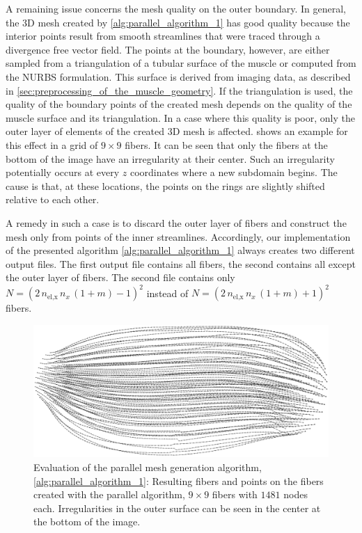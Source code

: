 A remaining issue concerns the mesh quality on the outer boundary. In general, the 3D mesh created by \cref{alg:parallel_algorithm_1} has good quality because the interior points result from smooth streamlines that were traced through a divergence free vector field. 
The points at the boundary, however, are either sampled from a triangulation of a tubular surface of the muscle or computed from the NURBS formulation. This surface is derived from imaging data, as described in \cref{sec:preprocessing_of_the_muscle_geometry}. If the triangulation is used, the quality of the boundary points of the created mesh depends on the quality of the muscle surface and its triangulation. In a case where this quality is poor, only the outer layer of elements of the created 3D mesh is affected.  shows an example for this effect in a grid of $9 \times 9$ fibers. It can be seen that only the fibers at the bottom of the image have an irregularity at their center. Such an irregularity potentially occurs at every $z$ coordinates where a new subdomain begins. The cause is that, at these locations, the points on the rings are slightly shifted relative to each other.

A remedy in such a case is to discard the outer layer of fibers and construct the mesh only from points of the inner streamlines.
Accordingly, our implementation of the presented algorithm \cref{alg:parallel_algorithm_1} always creates two different output files. The first output file contains all fibers, the second contains all except the outer layer of fibers. The second file contains only $N=(2\,n_\text{el,x}\,n_x\,(1+m)-1)^2$ instead of $N=(2\,n_\text{el,x}\,n_x\,(1+m)+1)^2$ fibers.
\begin{figure}%
  \centering%
  \includegraphics[width=\textwidth]{images/parallel_fiber_estimation/poor_boundary_33x33.png}%
  \caption{Evaluation of the parallel mesh generation algorithm, \cref{alg:parallel_algorithm_1}: Resulting fibers and points on the fibers created with the parallel algorithm, $9\times 9$ fibers with $1481$ nodes each. Irregularities in the outer surface can be seen in the  center at the bottom of the image.}%
  \label{fig:poor_boundary_33x33}%
\end{figure}%

